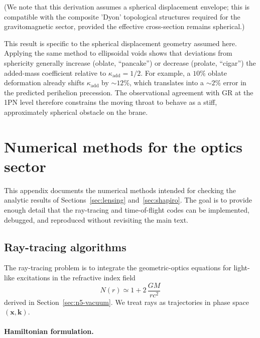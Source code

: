 \documentclass[11pt]{article}
\begin{document}
(We note that this derivation assumes a spherical displacement envelope; this is compatible with the composite 'Dyon' topological structures required for the gravitomagnetic sector, provided the effective cross-section remains spherical.)

This result is specific to the spherical displacement geometry assumed here.
Applying the same method to ellipsoidal voids shows that deviations from
sphericity generally increase (oblate, ``pancake'') or decrease (prolate,
``cigar'') the added-mass coefficient relative to $\kappa_{\mathrm{add}}=1/2$.
For example, a $10\%$ oblate deformation already shifts
$\kappa_{\mathrm{add}}$ by $\sim 12\%$, which translates into a
$\sim 2\%$ error in the predicted perihelion precession.
The observational agreement with GR at the 1PN level therefore constrains
the moving throat to behave as a stiff, approximately spherical obstacle on
the brane.

\section{Numerical methods for the optics sector}
\label{app:numerics-optics}

This appendix documents the numerical methods intended for checking the
analytic results of Sections~\ref{sec:lensing} and~\ref{sec:shapiro}.
The goal is to provide enough detail that the ray-tracing and
time-of-flight codes can be implemented, debugged, and reproduced without
revisiting the main text.

\subsection{Ray-tracing algorithms}
\label{subsec:app-ray-tracing}

The ray-tracing problem is to integrate the geometric-optics equations for
light-like excitations in the refractive index field
\begin{equation}
  N(r)
  \simeq 1 + 2\,\frac{GM}{r c^2}
\end{equation}
derived in Section~\ref{sec:n5-vacuum}.
We treat rays as trajectories in phase space $(\mathbf{x},\mathbf{k})$.

\paragraph{Hamiltonian formulation.}
\end{document}
